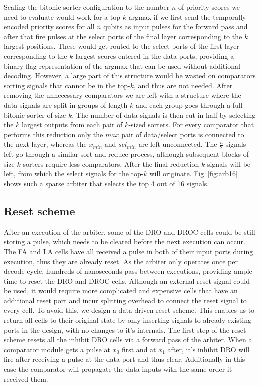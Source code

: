 \documentclass[conference]{IEEEtran}
\begin{document}
Scaling the bitonic sorter configuration to the number $n$ of priority scores we need to evaluate would work for a top-$k$ argmax if we first send the temporally encoded priority scores for all $n$ qubits as input pulses for the forward pass and after that fire pulses at the select ports of the final layer corresponding to the $k$ largest positions.
These would get routed to the select ports of the first layer corresponding to the $k$ largest scores entered in the data ports, providing a binary flag representation of the argmax that can be used without additional decoding.
However, a large part of this structure would be wasted on comparators sorting signals that cannot be in the top-$k$, and thus are not needed.
After removing the unnecessary comparators we are left with a structure where the data signals are split in groups of length $k$ and each group goes through a full bitonic sorter of size $k$.
The number of data signals is then cut in half by selecting the $k$ largest outputs from each pair of $k$-sized sorters.
For every comparator that performs this reduction only the $max$ pair of data/select ports is connected to the next layer, whereas the $x_{min}$ and $sel_{min}$ are left unconnected.
The $\frac{n}{2}$ signals left go through a similar sort and reduce process, although subsequent blocks of size $k$ sorters require less comparators. 
After the final reduction $k$ signals will be left, from which the select signals for the top-$k$ will originate.
Fig~\ref{fig:arb16} shows such a sparse arbiter that selects the top 4 out of 16 signals.

\subsection{Reset scheme}

After an execution of the arbiter, some of the DRO and DROC cells could be still storing a pulse, which needs to be cleared before the next execution can occur.
The FA and LA cells have all received a pulse in both of their input ports during execution, thus they are already reset.
As the arbiter only operates once per decode cycle, hundreds of nanoseconds pass between executions, providing ample time to reset the DRO and DROC cells.
Although an external reset signal could be used, it would require more complicated and expensive cells that have an additional reset port and incur splitting overhead to connect the reset signal to every cell.
To avoid this, we design a data-driven reset scheme.
This enables us to return all cells to their original state by only inserting signals to already existing ports in the design, with no changes to it's internals.
The first step of the reset scheme resets all the inhibit DRO cells via a forward pass of the arbiter.
When a comparator module gets a pulse at $x_0$ first and at $x_1$ after, it's inhibit DRO will fire after receiving a pulse at the data port and thus clear.
Additionally in this case the comparator will propagate the data inputs with the same order it received them.
\end{document}

